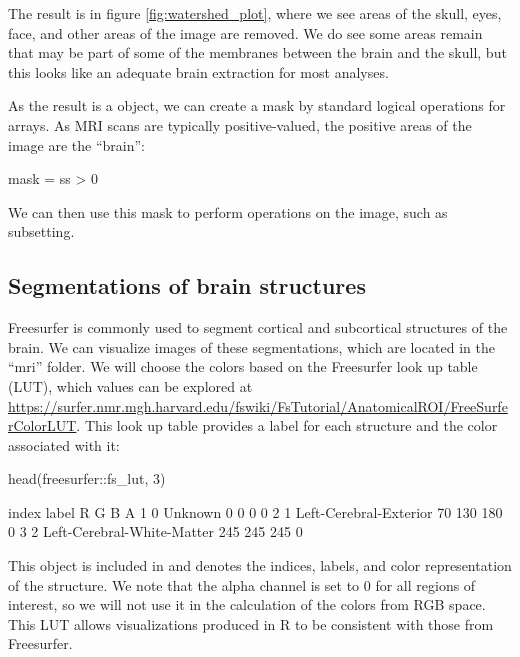 The result is in figure \ref{fig:watershed_plot}, where we see areas of
the skull, eyes, face, and other areas of the image are removed. We do
see some areas remain that may be part of some of the membranes between
the brain and the skull, but this looks like an adequate brain
extraction for most analyses.

As the result is a  object, we can create a mask by standard
logical operations for arrays. As MRI scans are typically
positive-valued, the positive areas of the image are the ``brain'':

\begin{Schunk}
\begin{Sinput}
mask = ss > 0
\end{Sinput}
\end{Schunk}

We can then use this mask to perform operations on the image, such as
subsetting.

\subsection{Segmentations of brain
structures}\label{segmentations-of-brain-structures}

Freesurfer is commonly used to segment cortical and subcortical
structures of the brain. We can visualize images of these segmentations,
which are located in the ``mri'' folder. We will choose the colors based
on the Freesurfer look up table (LUT), which values can be explored at
\url{https://surfer.nmr.mgh.harvard.edu/fswiki/FsTutorial/AnatomicalROI/FreeSurferColorLUT}.
This look up table provides a label for each structure and the color
associated with it:

\begin{Schunk}
\begin{Sinput}
head(freesurfer::fs_lut, 3)
\end{Sinput}
\begin{Soutput}
  index                      label   R   G   B A
1     0                    Unknown   0   0   0 0
2     1     Left-Cerebral-Exterior  70 130 180 0
3     2 Left-Cerebral-White-Matter 245 245 245 0
\end{Soutput}
\end{Schunk}

This object is included in  and denotes the indices,
labels, and color representation of the structure. We note that the
alpha channel is set to \(0\) for all regions of interest, so we will
not use it in the calculation of the colors from RGB space. This LUT
allows visualizations produced in R to be consistent with those from
Freesurfer.\\

